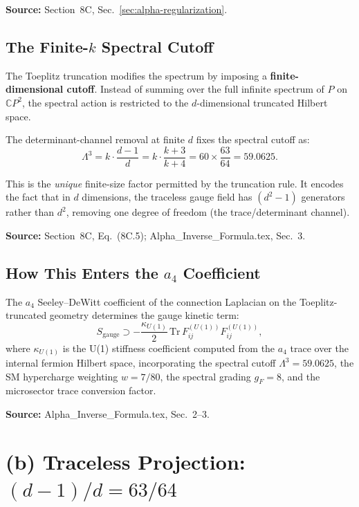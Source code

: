 \documentclass[12pt,a4paper]{article}
\begin{document}
\textbf{Source:} Section~8C, Sec.~\ref*{sec:alpha-regularization}.

\subsection{The Finite-$k$ Spectral Cutoff}

The Toeplitz truncation modifies the spectrum by imposing a
\textbf{finite-dimensional cutoff}. Instead of summing over the full infinite
spectrum of $P$ on $\mathbb{C}P^2$, the spectral action is restricted to the
$d$-dimensional truncated Hilbert space.

The determinant-channel removal at finite $d$ fixes the spectral cutoff as:
\begin{equation}
\boxed{\Lambda^3 = k \cdot \frac{d-1}{d} = k \cdot \frac{k+3}{k+4}
= 60 \times \frac{63}{64} = 59.0625.}
\end{equation}

This is the \emph{unique} finite-size factor permitted by the truncation rule.
It encodes the fact that in $d$ dimensions, the traceless gauge field has
$(d^2-1)$ generators rather than $d^2$, removing one degree of freedom
(the trace/determinant channel).

\textbf{Source:} Section~8C, Eq.~(8C.5); Alpha\_Inverse\_Formula.tex, Sec.~3.

\subsection{How This Enters the $a_4$ Coefficient}

The $a_4$ Seeley--DeWitt coefficient of the connection Laplacian on the
Toeplitz-truncated geometry determines the gauge kinetic term:
\begin{equation}
S_{\mathrm{gauge}} \supset -\frac{\kappa_{U(1)}}{2}\,\mathrm{Tr}\,
F^{(U(1))}_{ij} F^{(U(1))}_{ij},
\end{equation}
where $\kappa_{U(1)}$ is the U(1) stiffness coefficient computed from the $a_4$
trace over the internal fermion Hilbert space, incorporating the spectral cutoff
$\Lambda^3 = 59.0625$, the SM hypercharge weighting $w = 7/80$, the spectral
grading $g_F = 8$, and the microsector trace conversion factor.

\textbf{Source:} Alpha\_Inverse\_Formula.tex, Sec.~2--3.

\section{(b) Traceless Projection: $(d-1)/d = 63/64$}
\label{sec:traceless}
\end{document}
